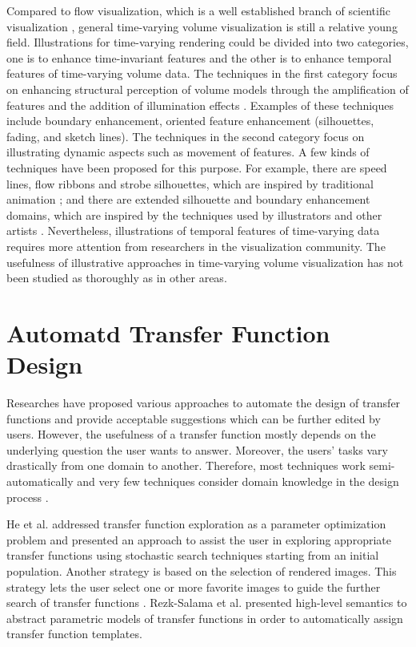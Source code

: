 Compared to flow visualization, which is a well established branch of scientific visualization \cite{brambilla_illustrative_2012}, general time-varying volume visualization is still a relative young field.
Illustrations for time-varying rendering could be divided into two categories, one is to enhance time-invariant features and the other is to enhance temporal features of time-varying volume data. The techniques in the first category focus on enhancing structural perception of volume models through the amplification of features and the addition of illumination effects \cite{rheingans_volume_2001} \cite{joshi_illustration-inspired_2005}. Examples of these techniques include boundary enhancement, oriented feature enhancement (silhouettes, fading, and sketch lines). The techniques in the second category focus on illustrating dynamic aspects such as movement of features. A few kinds of techniques have been proposed for this purpose. For example, there are speed lines, flow ribbons and strobe silhouettes, which are inspired by traditional animation \cite{joshi_illustration-inspired_2005} \cite{joshi_evaluation_2008} \cite{joshi_case_2009}; and there are extended silhouette and boundary enhancement domains, which are inspired by the techniques used by illustrators and other artists \cite{svakhine_illustration_2005}. Nevertheless, illustrations of temporal features of time-varying data requires more attention from researchers in the visualization community. The usefulness of illustrative approaches in time-varying volume visualization has not been studied as thoroughly as in other areas.

\section{Automatd Transfer Function Design}
Researches have proposed various approaches to automate the design of transfer functions and provide acceptable suggestions which can be further edited by users. However, the usefulness of a transfer function mostly depends on the underlying question the user wants to answer. Moreover, the users' tasks vary drastically from one domain to another. Therefore, most techniques work semi-automatically and very few techniques consider domain knowledge in the design process \cite{zudilova-seinstra_trends_2008}.

He et al. \cite{he_generation_1996} addressed transfer function exploration as a parameter optimization problem and presented an approach to assist the user in exploring appropriate transfer functions using stochastic search techniques starting from an initial population.
Another strategy is based on the selection of rendered images. This strategy lets the user select one or more favorite images to guide the further search of transfer functions \cite{marks_design_1997}.
Rezk-Salama et al. \cite{rezk-salama_automatic_2000} presented high-level semantics to abstract parametric models of transfer functions in order to automatically assign transfer function templates.

